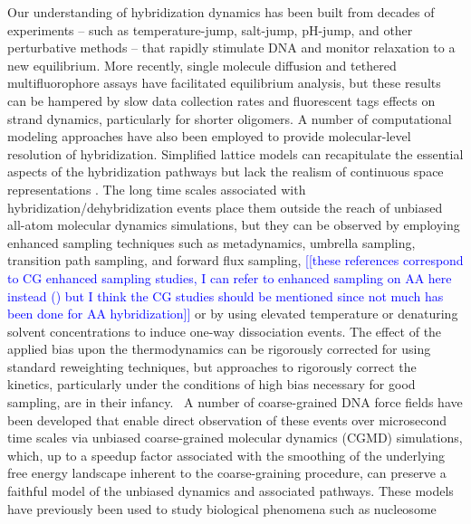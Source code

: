 \documentclass[journal=jpcbfk,manuscript=article]{achemso}
\newcommand*{\noteb}[1]{\textcolor{blue}{[[#1]]}}		%
\begin{document}
Our understanding of hybridization dynamics has been built from decades of experiments -- such as temperature-jump, salt-jump, pH-jump, and other perturbative methods -- that rapidly stimulate DNA and monitor relaxation to a new equilibrium.\citep{Morrison1993SensitiveSolution, Wetmur1968KineticsDNA, Craig1971RelaxationOligonucleotides, Porschke1973ThermodynamicsPairs, Williams1989LaserDGCATGC, Narayanan2012ExploringMixing, Chen2007InfluenceHybridization, Sanstead2018DirectDehybridization} More recently, single molecule diffusion and tethered multifluorophore assays have facilitated equilibrium analysis, but these results can be hampered by slow data collection rates and fluorescent tags effects on strand dynamics, particularly for shorter oligomers.\citep{Liu20173DSolution,  Schickinger2018TetheredHelices, Chen2008Base-by-baseSpectroscopy, Dupuis2013Single-moleculeHelices} A number of computational modeling approaches have also been employed to provide molecular-level resolution of hybridization. Simplified lattice models can recapitulate the essential aspects of the hybridization pathways but lack the realism of continuous space representations \citep{Araque2016LatticeCooperativity, Phys2019}. The long time scales associated with hybridization/dehybridization events place them outside the reach of unbiased all-atom molecular dynamics simulations,\citep{Phys2014} but they can be observed by employing enhanced sampling techniques such as metadynamics, umbrella sampling,  transition path sampling, and forward flux sampling,\citep{Hinckley2013AnHybridization, Schmitt2013ExploringSurface, Sambriski2009, Sambriski2009SequencePathways, Hoefert2011MolecularOligonucleotides,Romano2013DNADependence, Hinckley2014Coarse-grainedEffects} \noteb{these references correspond to CG enhanced sampling studies, I can refer to enhanced sampling on AA here instead (\citep{Piana2007AtomisticTransition, Zerze2021ThermodynamicsSimulations}) but I think the CG studies should be mentioned since not much has been done for AA hybridization} or by using elevated temperature or denaturing solvent concentrations to induce one-way dissociation events.\citep{Wong2008TheSimulations, Perez2010Real-timeUnfolding} The effect of the applied bias upon the thermodynamics can be rigorously corrected for using standard reweighting techniques, but approaches to rigorously correct the kinetics, particularly under the conditions of high bias necessary for good sampling, are in their infancy.~\citep{Prinz2011OptimalDynamics, Chodera2011DynamicalTemperatures, Stelzl2017DynamicSimulations, Donati2017GirsanovModels, Donati2018GirsanovSimulations, Quer2018ANCOORDINATES} A number of coarse-grained DNA force fields have been developed that enable direct observation of these events over microsecond time scales via unbiased coarse-grained molecular dynamics (CGMD) simulations, \citep{Romano2013DNADependence, Hinckley2013AnHybridization, Maciejczyk2014DNAModel, Markegard2015, Dans2016MultiscaleDNA} which, up to a speedup factor associated with the smoothing of the underlying free energy landscape inherent to the coarse-graining procedure, can preserve a faithful model of the unbiased dynamics and associated pathways. These models have previously been used to study biological phenomena such as nucleosome 
\end{document}
